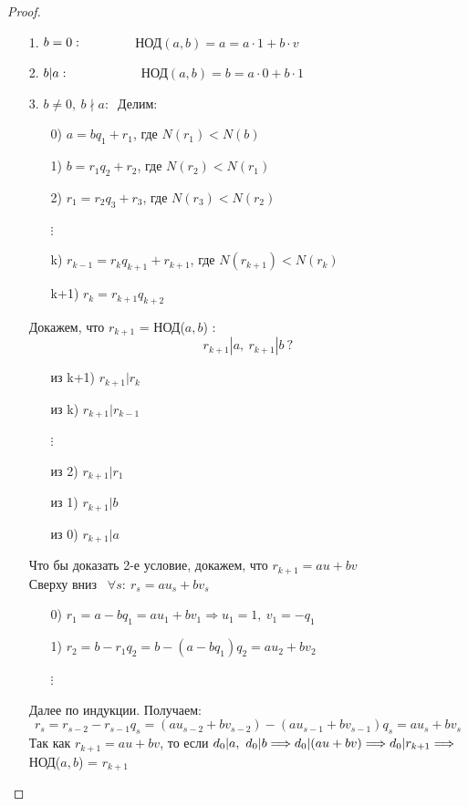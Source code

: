 \documentclass[a4paper, 12pt]{article}
\newcommand\tab[1][.5cm]{\hspace*{#1}}
\theoremstyle{definition}
\begin{document}
  \begin{proof}\tab
    \begin{itemize}
      \item[1.] $b = 0: \ \tab[1.27cm] $ НОД$(a,b) = a = a \cdot 1 + b \cdot v$
      \item[2.] $b|a: \ \tab[1.8cm] $ НОД$(a,b) = b = a \cdot 0 + b \cdot 1$
      \item[3.] $b \neq 0, \ b\nmid a: \ $ Делим: 
      \begin{itemize}
        \item[0)] $a = bq_1 + r_1$, где $N(r_1) < N(b)$
        \item[1)] $b = r_1q_2 + r_2$, где $N(r_2) < N(r_1)$
        \item[2)] $r_1 = r_2q_3 + r_3$, где $N(r_3) < N(r_2)$
        \item[ $\vdots$ ]
        \item[k)] $r_{k-1} = r_kq_{k+1} + r_{k+1}$, где $N(r_{k+1}) < N(r_k)$
        \item[k+1)] $r_k = r_{k+1}q_{k+2}$ 
      \end{itemize}
      Докажем, что $r_{k+1}$ = НОД($a,b$) :
      $$r_{k+1} | a, \ r_{k+1} | b \ ?$$
      \begin{itemize}
        \item[из k+1)] $r_{k+1} | r_k$
        \item[из k)] $r_{k+1} | r_{k-1}$
        \item[ $\vdots$ ]
        \item[из 2)] $r_{k+1} | r_1$
        \item[из 1)] $r_{k+1} | b$
        \item[из 0)] $r_{k+1} | a$ 
      \end{itemize}
      Что бы доказать 2-е условие, докажем, что $r_{k+1} = au+bv$\\
      Сверху вниз \  $\forall s: \ r_s = au_s+bv_s$
      \begin{itemize}
        \item[0)] $r_{1} = a-bq_1 = au_1+bv_1 \Longrightarrow u_1=1, \ v_1 = -q_1$
        \item[1)] $r_{2} = b - r_1q_2 = b-(a-bq_1)q_2 = au_2+bv_2$
        \item[ $\vdots$ ]  
      \end{itemize}
      Далее по индукции. Получаем:
      $$r_s = r_{s-2} - r_{s-1}q_s = (au_{s-2} + bv_{s-2}) - (au_{s-1} + bv_{s-1})q_s = au_s + bv_s$$
      Так как $r_{k+1} = au+bv$, то если $d_0|a, \ d_0| b \Longrightarrow d_0|(au+bv) \Longrightarrow d_0|r_{k+1}\\ \Longrightarrow $ НОД($a,b$) = $r_{k+1}$
    \end{itemize}
  \end{proof}
\end{document}
